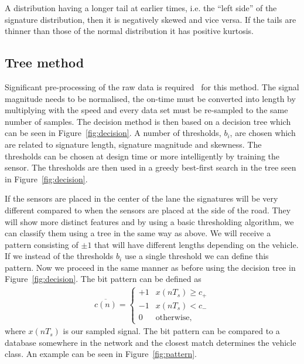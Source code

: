 A distribution having a longer tail at earlier times, i.e. the ``left side'' of the signature distribution, then it is negatively skewed and vice versa. If the tails are thinner than those of the normal distribution it has positive kurtosis.

\subsection{Tree method}
Significant pre-processing of the raw data is required~\cite{cheung2005-2} for this method. The signal magnitude needs to be normalised, the on-time must be converted into length by multiplying with the speed and every data set must be re-sampled to the same number of samples. The decision method is then based on a decision tree which can be seen in Figure~\ref{fig:decision}. A number of thresholds, $b_i$, are chosen which are related to signature length, signature magnitude and skewness. The thresholds can be chosen at design time or more intelligently by training the sensor. The thresholds are then used in a greedy best-first search in the tree seen in Figure~\ref{fig:decision}.

If the sensors are placed in the center of the lane the signatures will be very different compared to when the sensors are placed at the side of the road. They will show more distinct features and by using a basic thresholding algorithm, we can classify them using a tree in the same way as above. We will receive a pattern consisting of ${\pm 1}$ that will have different lengths depending on the vehicle. If we instead of the thresholds $b_i$ use a single threshold we can define this pattern. Now we proceed in the same manner as before using the decision tree in Figure~\ref{fig:decision}. The bit pattern can be defined as
\begin{align}
 \overline{c(n)} = \left\{\begin{array}{cl}
+1 & x(nT_s) \geq c_+\\
- 1 & x(nT_s) < c_-\\
0 & \text{otherwise},
\end{array}\right.
\end{align}
where $x(nT_s)$ is our sampled signal. The bit pattern can be compared to a database somewhere in the network and the closest match determines the vehicle class. An example can be seen in \mbox{Figure~\ref{fig:pattern}.}

